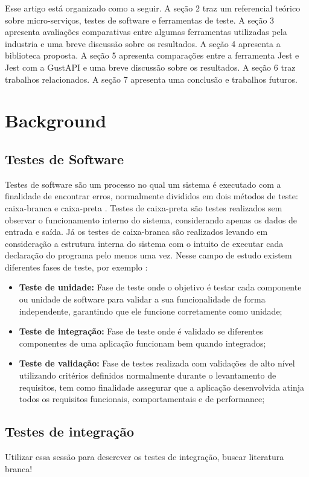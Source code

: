 \documentclass[10pt,brazil,english]{article}
\begin{document}
Esse artigo está organizado como a seguir. A seção 2 traz um referencial teórico sobre micro-serviços, testes de software e ferramentas de teste. A seção 3 apresenta avaliações comparativas entre algumas ferramentas utilizadas pela industria e uma breve discussão sobre os resultados. A seção 4 apresenta a biblioteca proposta. A seção 5 apresenta comparações entre a ferramenta Jest e Jest com a GustAPI e uma breve discussão sobre os resultados. A seção 6 traz trabalhos relacionados. A seção 7 apresenta uma conclusão e trabalhos futuros. 

\section{Background}
\subsection{Testes de Software}
Testes de software são um processo no qual um sistema é executado com a finalidade de encontrar erros, normalmente divididos em dois métodos de teste: caixa-branca e caixa-preta \cite{myers2004art}. Testes de caixa-preta são testes realizados sem observar o funcionamento interno do sistema, considerando apenas os dados de entrada e saída. Já os testes de caixa-branca são realizados levando em consideração a estrutura interna do sistema com o intuito de executar cada declaração do programa pelo menos uma vez. Nesse campo de estudo existem diferentes fases de teste, por exemplo \cite{thakare2012software}:
\begin{itemize}
\item \textbf{Teste de unidade:} Fase de teste onde o objetivo é testar cada componente ou unidade de software para validar a sua funcionalidade de forma independente, garantindo que ele funcione corretamente como unidade;
\item \textbf{Teste de integração:} Fase de teste onde é validado se diferentes componentes de uma aplicação funcionam bem quando integrados;
\item \textbf{Teste de validação:} Fase de testes realizada com validações de alto nível utilizando critérios definidos normalmente durante o levantamento de requisitos, tem como finalidade assegurar que a aplicação desenvolvida atinja todos os requisitos funcionais, comportamentais e de performance;
\end{itemize}

\subsection{Testes de integração}
Utilizar essa sessão para descrever os testes de integração, buscar literatura branca!
\end{document}
